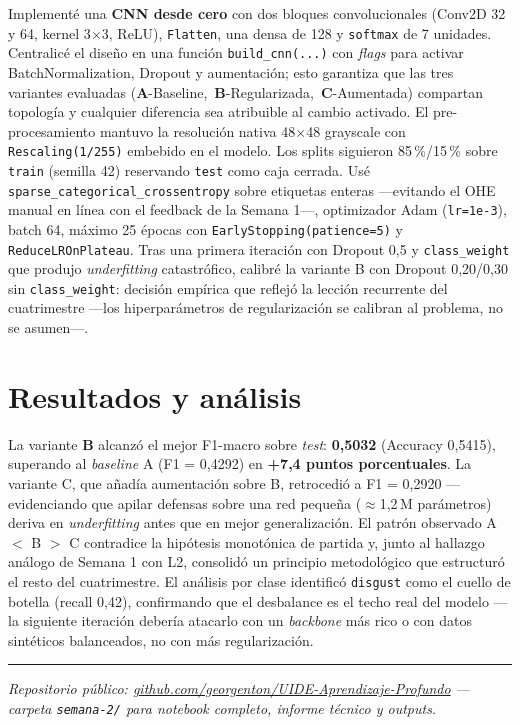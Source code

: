 \documentclass[11pt,a4paper]{article}
\begin{document}
Implementé una \textbf{CNN desde cero} con dos bloques convolucionales (Conv2D 32 y 64, kernel 3$\times$3, ReLU), \texttt{Flatten}, una densa de 128 y \texttt{softmax} de 7 unidades. Centralicé el diseño en una función \texttt{build\_cnn(...)} con \emph{flags} para activar BatchNormalization, Dropout y aumentación; esto garantiza que las tres variantes evaluadas \mbox{(\textbf{A}-Baseline, \textbf{B}-Regularizada, \textbf{C}-Aumentada)} compartan topología y cualquier diferencia sea atribuible al cambio activado. El pre-procesamiento mantuvo la resolución nativa 48$\times$48 grayscale con \texttt{Rescaling(1/255)} embebido en el modelo. Los splits siguieron 85\,\%/15\,\% sobre \texttt{train} (semilla 42) reservando \texttt{test} como caja cerrada. Usé \texttt{sparse\_categorical\_crossentropy} sobre etiquetas enteras —evitando el OHE manual en línea con el feedback de la Semana 1—, optimizador Adam (\texttt{lr=1e-3}), batch 64, máximo 25 épocas con \texttt{EarlyStopping(patience=5)} y \texttt{ReduceLROnPlateau}. Tras una primera iteración con Dropout 0{,}5 y \texttt{class\_weight} que produjo \emph{underfitting} catastrófico, calibré la variante B con Dropout 0{,}20/0{,}30 sin \texttt{class\_weight}: decisión empírica que reflejó la lección recurrente del cuatrimestre —los hiperparámetros de regularización se calibran al problema, no se asumen—.

\section{Resultados y análisis}

La variante \textbf{B} alcanzó el mejor F1-macro sobre \emph{test}: \textbf{0{,}5032} (Accuracy 0{,}5415), superando al \emph{baseline} A (F1 = 0{,}4292) en \textbf{+7{,}4 puntos porcentuales}. La variante C, que añadía aumentación sobre B, retrocedió a F1 = 0{,}2920 —evidenciando que apilar defensas sobre una red pequeña ($\approx$1{,}2\,M parámetros) deriva en \emph{underfitting} antes que en mejor generalización. El patrón observado A $<$ B $>$ C contradice la hipótesis monotónica de partida y, junto al hallazgo análogo de Semana 1 con L2, consolidó un principio metodológico que estructuró el resto del cuatrimestre. El análisis por clase identificó \texttt{disgust} como el cuello de botella (recall 0{,}42), confirmando que el desbalance es el techo real del modelo —la siguiente iteración debería atacarlo con un \emph{backbone} más rico o con datos sintéticos balanceados, no con más regularización.

\rule{\textwidth}{0.4pt}
{\footnotesize\textit{Repositorio público: \href{https://github.com/georgenton/UIDE-Aprendizaje-Profundo}{github.com/georgenton/UIDE-Aprendizaje-Profundo} --- carpeta \texttt{semana-2/} para notebook completo, informe técnico y outputs.}\par}
\end{document}
